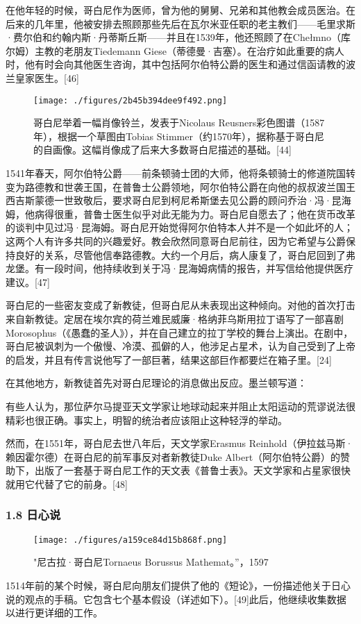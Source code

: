 在他年轻的时候，哥白尼作为医师，曾为他的舅舅、兄弟和其他教会成员医治。在后来的几年里，他被安排去照顾那些先后在瓦尔米亚任职的老主教们——毛里求斯·费尔伯和约翰内斯·丹蒂斯丘斯——并且在1539年，他还照顾了在Chełmno（库尔姆）主教的老朋友Tiedemann Giese（蒂德曼·吉塞）。在治疗如此重要的病人时，他有时会向其他医生咨询，其中包括阿尔伯特公爵的医生和通过信函请教的波兰皇家医生。[46]
\begin{figure}[ht]
\centering
\texttt{[image: ./figures/2b45b394dee9f492.png]}
\caption{哥白尼举着一幅肖像铃兰，发表于Nicolaus Reusners彩色图谱（1587年），根据一个草图由Tobias Stimmer（约1570年），据称基于哥白尼的自画像。这幅肖像成了后来大多数哥白尼描述的基础。[44]} \label{fig_GBN_16}
\end{figure}
1541年春天，阿尔伯特公爵——前条顿骑士团的大师，他将条顿骑士的修道院国转变为路德教和世袭王国，在普鲁士公爵领地，阿尔伯特公爵在向他的叔叔波兰国王西吉斯蒙德一世致敬后，要求哥白尼到柯尼希斯堡去见公爵的顾问乔治·冯·昆海姆，他病得很重，普鲁士医生似乎对此无能为力。哥白尼自愿去了；他在货币改革的谈判中见过冯·昆海姆。哥白尼开始觉得阿尔伯特本人并不是一个如此坏的人；这两个人有许多共同的兴趣爱好。教会欣然同意哥白尼前往，因为它希望与公爵保持良好的关系，尽管他信奉路德教。大约一个月后，病人康复了，哥白尼回到了弗龙堡。有一段时间，他持续收到关于冯·昆海姆病情的报告，并写信给他提供医疗建议。[47]

哥白尼的一些密友变成了新教徒，但哥白尼从未表现出这种倾向。对他的首次打击来自新教徒。定居在埃尔宾的荷兰难民威廉·格纳菲乌斯用拉丁语写了一部喜剧Morosophus（《愚蠢的圣人》），并在自己建立的拉丁学校的舞台上演出。在剧中，哥白尼被讽刺为一个傲慢、冷漠、孤僻的人，他涉足占星术，认为自己受到了上帝的启发，并且有传言说他写了一部巨著，结果这部巨作都要烂在箱子里。[24]

在其他地方，新教徒首先对哥白尼理论的消息做出反应。墨兰顿写道：

有些人认为，那位萨尔马提亚天文学家让地球动起来并阻止太阳运动的荒谬说法很精彩也很正确。事实上，明智的统治者应该阻止这种轻浮的举动。

然而，在1551年，哥白尼去世八年后，天文学家Erasmus Reinhold（伊拉兹马斯·赖因霍尔德）在哥白尼的前军事反对者新教徒Duke Albert（阿尔伯特公爵）的赞助下，出版了一套基于哥白尼工作的天文表《普鲁士表》。天文学家和占星家很快就用它代替了它的前身。[48]

\subsubsection{1.8 日心说}
\begin{figure}[ht]
\centering
\texttt{[image: ./figures/a159ce84d15b868f.png]}
\caption{"尼古拉·哥白尼Tornaeus Borussus Mathemat。”，1597} \label{fig_GBN_17}
\end{figure}
1514年前的某个时候，哥白尼向朋友们提供了他的《短论》，一份描述他关于日心说的观点的手稿。它包含七个基本假设（详述如下）。[49]此后，他继续收集数据以进行更详细的工作。

